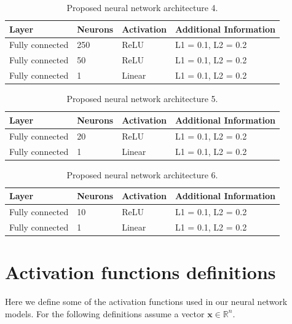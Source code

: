 \documentclass[preprint,12pt]{elsarticle}%
\begin{document}
\begin{table}[H]
\centering
\caption{Proposed neural network architecture 4.}%
\begin{tabular}
[c]{llll}\hline
Layer & Neurons & Activation & Additional Information\\\hline
Fully connected & 250 & ReLU & L1 = 0.1, L2 = 0.2\\
Fully connected & 50 & ReLU & L1 = 0.1, L2 = 0.2\\
Fully connected & 1 & Linear & L1 = 0.1, L2 = 0.2\\\hline
\end{tabular}
\label{table:proposed_nn_4}%
\end{table}

\begin{table}[H]
\centering
\caption{Proposed neural network architecture 5.}%
\begin{tabular}
[c]{llll}\hline
Layer & Neurons & Activation & Additional Information\\\hline
Fully connected & 20 & ReLU & L1 = 0.1, L2 = 0.2\\
Fully connected & 1 & Linear & L1 = 0.1, L2 = 0.2\\\hline
\end{tabular}
\label{table:proposed_nn_5}%
\end{table}

\begin{table}[H]
\centering
\caption{Proposed neural network architecture 6.}%
\begin{tabular}
[c]{llll}\hline
Layer & Neurons & Activation & Additional Information\\\hline
Fully connected & 10 & ReLU & L1 = 0.1, L2 = 0.2\\
Fully connected & 1 & Linear & L1 = 0.1, L2 = 0.2\\\hline
\end{tabular}
\label{table:proposed_nn_6}%
\end{table}


\pagebreak

\section{Activation functions definitions}
\label{appendix:activation_definitions}

Here we define some of the activation functions used in our neural network models. For the following definitions assume a vector $\mathbf{x} \in \mathbb{R}^n$.
\end{document}
